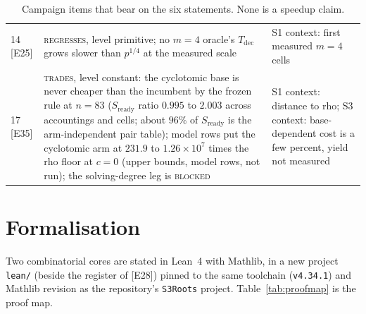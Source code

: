 \documentclass[10pt,a4paper]{article}
\newcommand{\ev}[1]{\textup{[#1]}}
\theoremstyle{definition}
\theoremstyle{remark}
\begin{document}
\begin{table}[t]
\begin{tabular}{@{}l p{6.6cm} p{4.3cm}@{}}
14 \ev{E25} & \textsc{regresses}, level primitive; no $m=4$ oracle's $T_{\mathrm{dec}}$ grows slower than $p^{1/4}$ at the measured scale & S1 context: first measured $m=4$ cells \\
17 \ev{E35} & \textsc{trades}, level constant: the cyclotomic base is never cheaper than the incumbent by the frozen rule at $n=83$ ($S_{\mathrm{ready}}$ ratio $0.995$ to $2.003$ across accountings and cells; about $96\%$ of $S_{\mathrm{ready}}$ is the arm-independent pair table); model rows put the cyclotomic arm at $231.9$ to $1.26\times10^{7}$ times the rho floor at $c=0$ (upper bounds, model rows, not run); the solving-degree leg is \textsc{blocked} & S1 context: distance to rho; S3 context: base-dependent cost is a few percent, yield not measured \\
\bottomrule
\end{tabular}
\caption{Campaign items that bear on the six statements. None is a speedup claim.}
\label{tab:campaign}
\end{table}

\section{Formalisation}
\label{sec:lean}

Two combinatorial cores are stated in Lean~4 with Mathlib, in a new project
\texttt{lean/} (beside the register of \ev{E28}) pinned to the same toolchain (\texttt{v4.34.1}) and Mathlib revision
as the repository's \texttt{S3Roots} project. Table~\ref{tab:proofmap} is the proof map.
\end{document}
